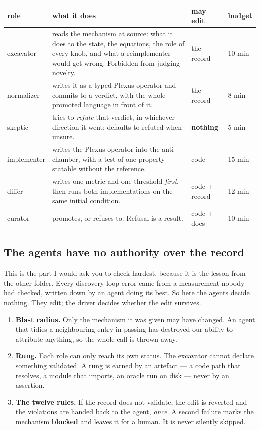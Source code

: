 \documentclass[11pt,a4paper]{article}
\begin{document}
\begin{center}
\small
\begin{tabular}{@{}l p{7.9cm} l l@{}}
\toprule
\textbf{role} & \textbf{what it does} & \textbf{may edit} & \textbf{budget}\\
\midrule
excavator & reads the mechanism at source: what it does to the state, the equations, the role of
every knob, and what a reimplementer would get wrong. Forbidden from judging novelty. & the record
& 10 min\\
normalizer & writes it as a typed Plexus operator and commits to a verdict, with the whole
promoted language in front of it. & the record & 8 min\\
skeptic & tries to \emph{refute} that verdict, in whichever direction it went; defaults to refuted
when unsure. & \textbf{nothing} & 5 min\\
implementer & writes the Plexus operator into the anti-chamber, with a test of one property
statable without the reference. & code & 15 min\\
differ & writes one metric and one threshold \emph{first}, then runs both implementations on the
same initial condition. & code + record & 12 min\\
curator & promotes, or refuses to. Refusal is a result. & code + docs & 10 min\\
\bottomrule
\end{tabular}
\end{center}

\subsection{The agents have no authority over the record}

This is the part I would ask you to check hardest, because it is the lesson from the other folder.
Every discovery-loop error came from a measurement nobody had checked, written down by an agent
doing its best. So here the agents decide nothing. They edit; the driver decides whether the edit
survives.

\begin{enumerate}[leftmargin=1.4em]
\item \textbf{Blast radius.} Only the mechanism it was given may have changed. An agent that tidies
a neighbouring entry in passing has destroyed our ability to attribute anything, so the whole call
is thrown away.
\item \textbf{Rung.} Each role can only reach its own status. The excavator cannot declare
something validated. A rung is earned by an artefact --- a code path that resolves, a module that
imports, an oracle run on disk --- never by an assertion.
\item \textbf{The twelve rules.} If the record does not validate, the edit is reverted and the
violations are handed back to the agent, \emph{once}. A second failure marks the mechanism
\textbf{blocked} and leaves it for a human. It is never silently skipped.
\end{enumerate}
\end{document}

